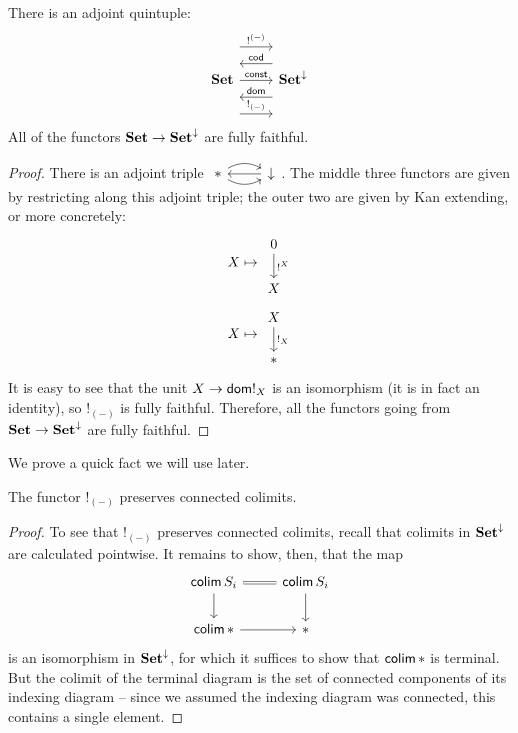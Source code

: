 \begin{prop}
  There is an adjoint quintuple:
  \[
    \begin{tikzcd}
      \Set \arrow[r, "\const"] \arrow[r, leftarrow, shift left = 5,
      "\term{cod}"] \arrow[r, leftarrow, shift right = 5, "\term{dom}"]
      \arrow[r, shift left = 10, "!^{(-)}"]  \arrow[r, shift right = 10, "!_{(-)}"] & \Set^{\down}
    \end{tikzcd}
  \]
  All of the functors $\operatorname{\textbf{Set}} \to \operatorname{\textbf{Set}}^{\mathbin{\downarrow}}$ are fully faithful.
\end{prop}
\begin{proof}
There is an adjoint triple $\begin{tikzcd} \ast \arrow[r,leftarrow] \arrow[r,
  bend left] \arrow[r, bend right] & \down \end{tikzcd}$. The middle three
functors are given by restricting along this adjoint triple; the outer two are
given by Kan extending, or more concretely:
  $$X \mapsto \begin{tikzcd} 0 \arrow[d, "!^X"] \\ X \end{tikzcd}$$
  $$X \mapsto \begin{tikzcd} X \arrow[d, "!_X"] \\ \ast \end{tikzcd}$$
It is easy to see that the unit $X \to \mathsf{{dom}} !_{X}$ is an isomorphism (it is in
fact an identity), so $!_{(-)}$ is fully faithful. Therefore, all the functors
going from $\operatorname{\textbf{Set}} \to \operatorname{\textbf{Set}}^{\mathbin{\downarrow}}$ are fully faithful.
\end{proof}

We prove a quick fact we will use later.
\begin{lem}\label{lem:bang.preserves.connected.colimits}
  The functor $!_{(-)}$ preserves connected colimits.
\end{lem}
\begin{proof}
  To see that $!_{(-)}$ preserves connected colimits, recall that colimits in $\operatorname{\textbf{Set}}^{\mathbin{\downarrow}}$ are calculated pointwise. It remains to show, then, that the map
  \[
    \begin{tikzcd}
    \colim S_i \arrow[r, equals] \arrow[d] & \colim S_i \arrow[d] \\
    \colim \ast \arrow[r] & \ast 
    \end{tikzcd}
  \]
  is an isomorphism in $\operatorname{\textbf{Set}}^{\mathbin{\downarrow}}$, for which it suffices to show that
  $\operatorname{\mathsf{colim}} \ast$ is terminal. But the colimit of the terminal diagram is the set
  of connected components of its indexing diagram -- since we assumed the
  indexing diagram was connected, this contains a single element.
\end{proof}

